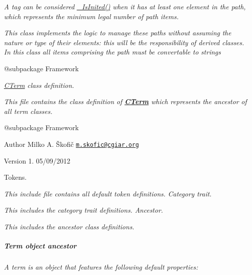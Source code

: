 {\itshape A tag can be considered \hyperlink{}{\-\_\-\-Is\-Inited()} when it has at least one element in the path, which represents the minimum legal number of path items.}

{\itshape This class implements the logic to manage these paths without assuming the nature or type of their elements\-: this will be the responsibility of derived classes. In this class all items comprising the path must be convertable to strings}

{\itshape \begin{DoxyVerb} @subpackage        Framework\end{DoxyVerb}
}

{\itshape {\itshape \hyperlink{class_c_term}{C\-Term}} class definition.}

{\itshape This file contains the class definition of {\bfseries \hyperlink{class_c_term}{C\-Term}} which represents the ancestor of all term classes.}

{\itshape \begin{DoxyVerb} @subpackage        Framework
\end{DoxyVerb}
}

{\itshape \begin{DoxyAuthor}{Author}
Milko A. Škofič \href{mailto:m.skofic@cgiar.org}{\tt m.\-skofic@cgiar.\-org} 
\end{DoxyAuthor}
\begin{DoxyVersion}{Version}
1. 05/09/2012
\end{DoxyVersion}
Tokens.}

{\itshape This include file contains all default token definitions. Category trait.}

{\itshape This includes the category trait definitions. Ancestor.}

{\itshape This includes the ancestor class definitions. \subparagraph*{Term object ancestor}}

{\itshape }

{\itshape A term is an object that features the following default properties\-:}


